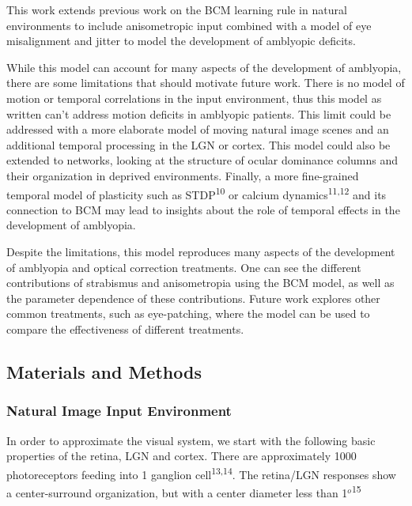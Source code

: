 \documentclass[
]{article}
\begin{document}
This work extends previous work on the BCM learning rule in natural
environments to include anisometropic input combined with a model of eye
misalignment and jitter to model the development of amblyopic deficits.

While this model can account for many aspects of the development of
amblyopia, there are some limitations that should motivate future work.
There is no model of motion or temporal correlations in the input
environment, thus this model as written can't address motion deficits in
amblyopic patients. This limit could be addressed with a more elaborate
model of moving natural image scenes and an additional temporal
processing in the LGN or cortex. This model could also be extended to
networks, looking at the structure of ocular dominance columns and their
organization in deprived environments. Finally, a more fine-grained
temporal model of plasticity such as STDP\textsuperscript{10} or calcium
dynamics\textsuperscript{11,12} and its connection to BCM may lead to
insights about the role of temporal effects in the development of
amblyopia.

Despite the limitations, this model reproduces many aspects of the
development of amblyopia and optical correction treatments. One can see
the different contributions of strabismus and anisometropia using the
BCM model, as well as the parameter dependence of these contributions.
Future work explores other common treatments, such as eye-patching,
where the model can be used to compare the effectiveness of different
treatments.

\subsection{Materials and Methods}\label{sec:materials-and-methods}

\subsubsection{Natural Image Input
Environment}\label{sec:natural-image-input-environment}

In order to approximate the visual system, we start with the following
basic properties of the retina, LGN and cortex. There are approximately
1000 photoreceptors feeding into 1 ganglion cell\textsuperscript{13,14}.
The retina/LGN responses show a center-surround organization, but with a
center diameter less than 1\(^o\)\textsuperscript{15}
\end{document}
